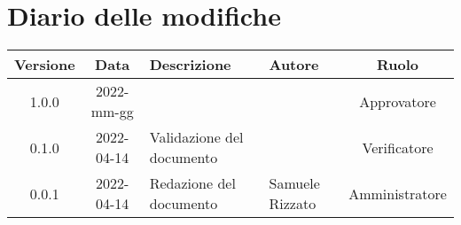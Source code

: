 \section*{Diario delle modifiche}
	\begin{center}
	\renewcommand{\arraystretch}{1.8} %
	\begin{tabular}{ |c|c|m{12em}|m{7em}|c| }
	\hline
	\textbf{Versione} & \textbf{Data} & \textbf{Descrizione} &  \textbf{Autore} &  \textbf{Ruolo} \\ %
	\hline
	1.0.0 & 2022-mm-gg & & \docApprovazione & Approvatore\\
	\hline
	0.1.0 & 2022-04-14 & Validazione del documento & \docVerificatori & Verificatore\\
	\hline
    0.0.1 & 2022-04-14 & Redazione del documento & Samuele \newline Rizzato & Amministratore\\ %
	\hline
	\end{tabular}
	\end{center}
	\newpage